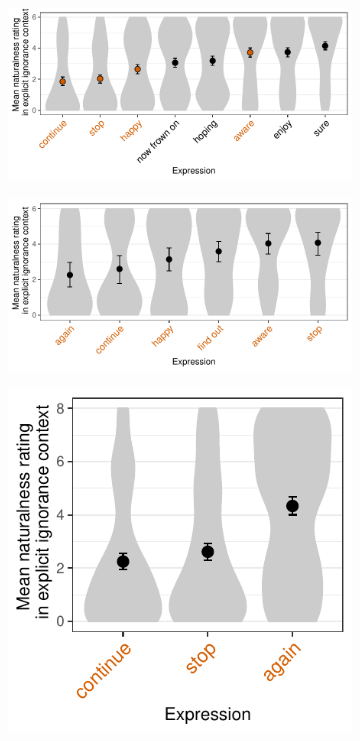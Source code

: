 \documentclass[11pt,fleqn]{article}
\newcommand{\6}{\mbox{$[\hspace*{-.6mm}[$}}
\newcommand{\9}{\mbox{$]\hspace*{-.6mm}]$}}
\begin{document}
\begin{figure}[h!]
\centering
\begin{subfigure}{1\textwidth}
\centering
\includegraphics[width=.65\textwidth]{../../../mandelkern-etal2020/graphs/explicit-ignorance-naturalness-by-expression}
\caption{\citealt[Exp.~3]{mandelkern-etal2020}}
\end{subfigure}

\begin{subfigure}{.64\textwidth}
\centering
\includegraphics[width=1\textwidth]{../../../kalomoiros-schwarz2024/exp1/graphs/explicit-ignorance-naturalness-by-expression}
\caption{\citealt[Exp.~1]{kalomoiros-schwarz2024}}
\end{subfigure} \begin{subfigure}{.35\textwidth}
\centering
\includegraphics[width=.9\textwidth]{../../../kalomoiros-schwarz2024/exp2/graphs/explicit-ignorance-naturalness-by-expression}
\caption{\citealt[Exp.~2]{kalomoiros-schwarz2024}}
\end{subfigure} 


\end{figure}
\end{document}
